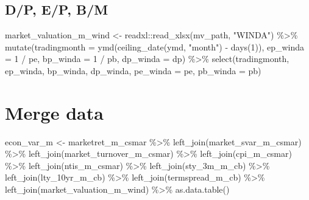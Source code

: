 \documentclass[
]{article}
\newenvironment{Shaded}{\begin{snugshade}}{\end{snugshade}}
\newcommand{\AttributeTok}[1]{\textcolor[rgb]{0.77,0.63,0.00}{#1}}
\newcommand{\DecValTok}[1]{\textcolor[rgb]{0.00,0.00,0.81}{#1}}
\newcommand{\FunctionTok}[1]{\textcolor[rgb]{0.00,0.00,0.00}{#1}}
\newcommand{\NormalTok}[1]{#1}
\newcommand{\OtherTok}[1]{\textcolor[rgb]{0.56,0.35,0.01}{#1}}
\newcommand{\SpecialCharTok}[1]{\textcolor[rgb]{0.00,0.00,0.00}{#1}}
\newcommand{\StringTok}[1]{\textcolor[rgb]{0.31,0.60,0.02}{#1}}
\begin{document}
\hypertarget{dp-ep-bm}{%
\subsection{D/P, E/P, B/M}\label{dp-ep-bm}}

\begin{Shaded}
\begin{Highlighting}[]
\NormalTok{market\_valuation\_m\_wind }\OtherTok{\textless{}{-}}\NormalTok{ readxl}\SpecialCharTok{::}\FunctionTok{read\_xlsx}\NormalTok{(mv\_path, }\StringTok{"WINDA"}\NormalTok{) }\SpecialCharTok{\%\textgreater{}\%} 
      \FunctionTok{mutate}\NormalTok{(}\AttributeTok{tradingmonth =} \FunctionTok{ymd}\NormalTok{(}\FunctionTok{ceiling\_date}\NormalTok{(ymd, }\StringTok{"month"}\NormalTok{) }\SpecialCharTok{{-}} \FunctionTok{days}\NormalTok{(}\DecValTok{1}\NormalTok{)), }\AttributeTok{ep\_winda =} \DecValTok{1} \SpecialCharTok{/}\NormalTok{ pe, }\AttributeTok{bp\_winda =} \DecValTok{1} \SpecialCharTok{/}\NormalTok{ pb, }\AttributeTok{dp\_winda =}\NormalTok{ dp) }\SpecialCharTok{\%\textgreater{}\%} 
      \FunctionTok{select}\NormalTok{(tradingmonth, ep\_winda, bp\_winda, dp\_winda, }\AttributeTok{pe\_winda =}\NormalTok{ pe, }\AttributeTok{pb\_winda =}\NormalTok{ pb) }
\end{Highlighting}
\end{Shaded}

\hypertarget{merge-data}{%
\section{Merge data}\label{merge-data}}

\begin{Shaded}
\begin{Highlighting}[]
\NormalTok{econ\_var\_m }\OtherTok{\textless{}{-}}\NormalTok{ marketret\_m\_csmar }\SpecialCharTok{\%\textgreater{}\%} 
  \FunctionTok{left\_join}\NormalTok{(market\_svar\_m\_csmar) }\SpecialCharTok{\%\textgreater{}\%} 
  \FunctionTok{left\_join}\NormalTok{(market\_turnover\_m\_csmar) }\SpecialCharTok{\%\textgreater{}\%} 
  \FunctionTok{left\_join}\NormalTok{(cpi\_m\_csmar) }\SpecialCharTok{\%\textgreater{}\%} 
  \FunctionTok{left\_join}\NormalTok{(ntis\_m\_csmar) }\SpecialCharTok{\%\textgreater{}\%} 
  \FunctionTok{left\_join}\NormalTok{(sty\_3m\_m\_cb) }\SpecialCharTok{\%\textgreater{}\%} 
  \FunctionTok{left\_join}\NormalTok{(lty\_10yr\_m\_cb) }\SpecialCharTok{\%\textgreater{}\%} 
  \FunctionTok{left\_join}\NormalTok{(termspread\_m\_cb) }\SpecialCharTok{\%\textgreater{}\%} 
  \FunctionTok{left\_join}\NormalTok{(market\_valuation\_m\_wind) }\SpecialCharTok{\%\textgreater{}\%} 
  \FunctionTok{as.data.table}\NormalTok{()}
\end{Highlighting}
\end{Shaded}


  
\end{document}
